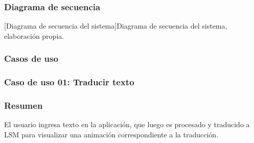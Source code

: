 \subsubsection{Diagrama de secuencia}
\begin{center}
    [Diagrama de secuencia del sistema]{Diagrama de secuencia del sistema, elaboración propia.}
\end{center}

\subsubsection{Casos de uso}
\subsubsection{Caso de uso 01: Traducir texto}
\subsubsection{Resumen}
El usuario ingresa texto en la aplicación, que luego es procesado y traducido a LSM para visualizar una animación correspondiente a la traducción.
